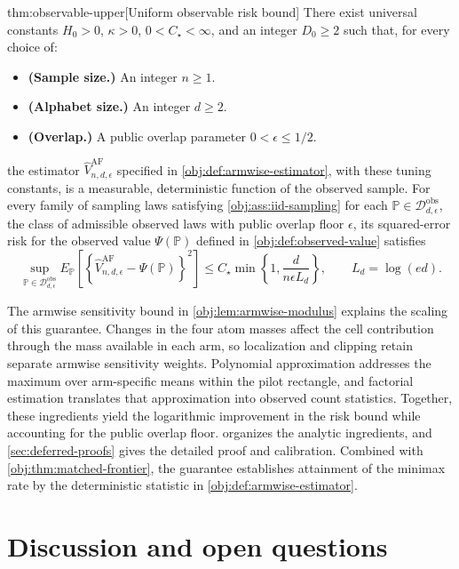 \documentclass[11pt]{article}
\begin{document}
\begin{theoremv}{thm:observable-upper}[Uniform observable risk bound]
There exist universal constants \(H_0>0\), \(\kappa>0\), \(0<C_\star<\infty\), and an integer \(D_0\ge2\) such that, for every choice of:
\begin{itemize}
\item \textbf{(Sample size.)} An integer \(n\ge1\).
\item \textbf{(Alphabet size.)} An integer \(d\ge2\).
\item \textbf{(Overlap.)} A public overlap parameter \(0<\epsilon\le1/2\).
\end{itemize}
the estimator \(\widehat V_{n,d,\epsilon}^{\mathrm{AF}}\) specified in \cref{obj:def:armwise-estimator}, with these tuning constants, is a measurable, deterministic function of the observed sample. For every family of sampling laws satisfying \cref{obj:ass:iid-sampling} for each \(\mathbb P\in\mathcal D_{d,\epsilon}^{\mathrm{obs}}\), the class of admissible observed laws with public overlap floor \(\epsilon\), its squared-error risk for the observed value \(\Psi(\mathbb P)\) defined in \cref{obj:def:observed-value} satisfies
\[
\sup_{\mathbb P\in\mathcal D_{d,\epsilon}^{\mathrm{obs}}}
E_{\mathbb P}\!\left[
\left\{\widehat V_{n,d,\epsilon}^{\mathrm{AF}}-\Psi(\mathbb P)\right\}^{2}
\right]
\le C_\star\min\left\{1,\frac{d}{n\epsilon L_d}\right\},
\qquad L_d=\log(ed).
\]
\end{theoremv}

The armwise sensitivity bound in \cref{obj:lem:armwise-modulus} explains the scaling of this guarantee. Changes in the four atom masses affect the cell contribution through the mass available in each arm, so localization and clipping retain separate armwise sensitivity weights. Polynomial approximation addresses the maximum over arm-specific means within the pilot rectangle, and factorial estimation translates that approximation into observed count statistics. Together, these ingredients yield the logarithmic improvement in the risk bound while accounting for the public overlap floor.  organizes the analytic ingredients, and \cref{sec:deferred-proofs} gives the detailed proof and calibration. Combined with \cref{obj:thm:matched-frontier}, the guarantee establishes attainment of the minimax rate by the deterministic statistic in \cref{obj:def:armwise-estimator}.


\section{Discussion and open questions}
\end{document}
